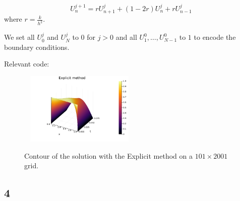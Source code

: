 \documentclass{article}
\numberwithin{equation}{section}
\theoremstyle{definition}
\begin{document}
\begin{equation}
    U_n^{j+1} = rU_{n+1}^j + (1-2r)U_n^j + rU_{n-1}^j
\end{equation}
where $r = \frac{k}{h^2}$.

We set all $U_0^j$ and $U_N^j$ to $0$ for $j>0$ and all $U_1^0, \dots, U_{N-1}^0$ to $1$ to encode the boundary conditions.

Relevant code: 

\begin{figure}[H]\
    \centering
    \includegraphics[width=0.46\textwidth]{qA3.png}
    \caption{Contour of the solution with the Explicit method on a $101 \times 2001$ grid.}
    \label{fig:afig_e}
\end{figure}

\subsection{4}
\end{document}
